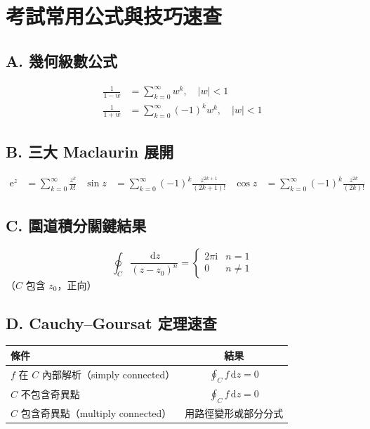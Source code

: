 \documentclass[12pt,a4paper]{article}
\newcommand{\dd}{\,\mathrm{d}}
\newcommand{\ii}{\mathrm{i}}
\newcommand{\ee}{\mathrm{e}}
\begin{document}
\section{考試常用公式與技巧速查}

\subsection*{A. 幾何級數公式}
\begin{align}
\frac{1}{1-w}&=\sum_{k=0}^{\infty}w^k, \quad |w|<1 \\[4pt]
\frac{1}{1+w}&=\sum_{k=0}^{\infty}(-1)^k w^k, \quad |w|<1
\end{align}

\subsection*{B. 三大 Maclaurin 展開}
\begin{align}
\ee^z&=\sum_{k=0}^{\infty}\frac{z^k}{k!} & \sin z&=\sum_{k=0}^{\infty}(-1)^k\frac{z^{2k+1}}{(2k+1)!} & \cos z&=\sum_{k=0}^{\infty}(-1)^k\frac{z^{2k}}{(2k)!}
\end{align}

\subsection*{C. 圍道積分關鍵結果}
$$\oint_C\frac{\dd{z}}{(z-z_0)^n}=\begin{cases}2\pi\ii & n=1\\0 & n\ne 1\end{cases}$$
（$C$ 包含 $z_0$，正向）

\subsection*{D. Cauchy--Goursat 定理速查}
\begin{center}
\begin{tabular}{|l|c|}
\hline
\textbf{條件} & \textbf{結果} \\
\hline
$f$ 在 $C$ 內部解析（simply connected） & $\oint_C f\dd{z}=0$ \\
$C$ 不包含奇異點 & $\oint_C f\dd{z}=0$ \\
$C$ 包含奇異點（multiply connected） & 用路徑變形或部分分式 \\
\hline
\end{tabular}
\end{center}
\end{document}
